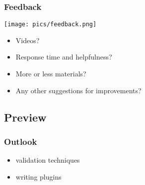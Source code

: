 \begin{frame}
	\frametitle{Feedback}
	\hfill \texttt{[image: pics/feedback.png]}
	\vspace{-1cm}
	\begin{itemize}
		\item Videos?
		\item Response time and helpfulness?
		\item More or less materials?
		\item Any other suggestions for improvements?
	\end{itemize}
\end{frame}

\subsection{Preview}

\begin{frame}
	\frametitle{Outlook}

	\begin{itemize}
	\item validation techniques
	\item writing plugins
	\end{itemize}
\end{frame}



\appendix

\begin{frame}[allowframebreaks]
	
	
\end{frame}



